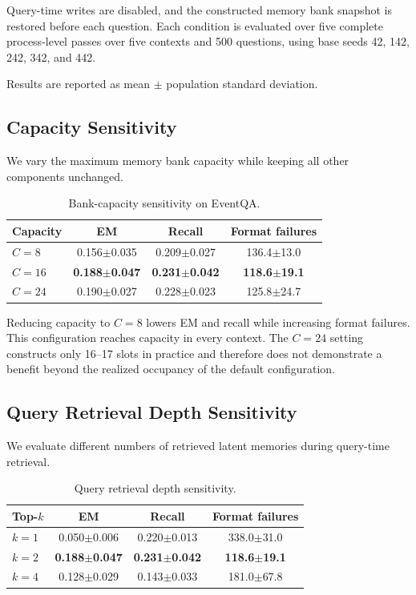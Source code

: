 \documentclass[letterpaper]{article}
\begin{document}
Query-time writes are disabled, and the constructed memory bank snapshot is
restored before each question. Each condition is evaluated over five
complete process-level passes over five contexts and 500 questions, using
base seeds 42, 142, 242, 342, and 442.

Results are reported as mean \(\pm\) population standard deviation.


\subsection{Capacity Sensitivity}
\label{sec:supp-capacity}

We vary the maximum memory bank capacity while keeping all other components
unchanged.

\begin{table}[t]
\centering
\begin{tabular}{lccc}
\toprule
Capacity & EM & Recall & Format failures\\
\midrule
$C=8$ &
0.156$\pm$0.035 &
0.209$\pm$0.027 &
136.4$\pm$13.0\\

$C=16$ &
\textbf{0.188$\pm$0.047} &
\textbf{0.231$\pm$0.042} &
\textbf{118.6$\pm$19.1}\\

$C=24$ &
0.190$\pm$0.027 &
0.228$\pm$0.023 &
125.8$\pm$24.7\\
\bottomrule
\end{tabular}
\caption{Bank-capacity sensitivity on EventQA.}
\label{tab:supp-capacity}
\end{table}


Reducing capacity to \(C=8\) lowers EM and recall while increasing format
failures. This configuration reaches capacity in every context. The
\(C=24\) setting constructs only 16--17 slots in practice and therefore
does not demonstrate a benefit beyond the realized occupancy of the default
configuration.


\subsection{Query Retrieval Depth Sensitivity}
\label{sec:supp-topk}

We evaluate different numbers of retrieved latent memories during query-time
retrieval.

\begin{table}[t]
\centering
\begin{tabular}{lccc}
\toprule
Top-$k$ & EM & Recall & Format failures\\
\midrule
$k=1$ &
0.050$\pm$0.006 &
0.220$\pm$0.013 &
338.0$\pm$31.0\\

$k=2$ &
\textbf{0.188$\pm$0.047} &
\textbf{0.231$\pm$0.042} &
\textbf{118.6$\pm$19.1}\\

$k=4$ &
0.128$\pm$0.029 &
0.143$\pm$0.033 &
181.0$\pm$67.8\\
\bottomrule
\end{tabular}
\caption{Query retrieval depth sensitivity.}
\label{tab:supp-topk}
\end{table}
\end{document}
